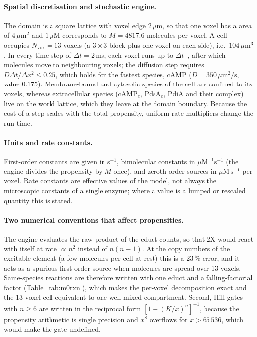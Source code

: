 \paragraph{Spatial discretisation and stochastic engine.}
The domain is a square lattice with voxel edge $2\,\mu$m, so that one voxel has a area of $4\,\mu\mathrm{m}^2$ and $1\,\mu\mathrm{M}$ corresponds to $M=4817.6$ molecules per voxel.
A cell occupies $N_\mathrm{vox}=13$ voxels (a $3\times3$ block plus one voxel on each side), i.e.\ $104\,\mu\mathrm{m}^3$.
In every time step of $\Delta t=2$\,ms, each voxel runs  up to $\Delta t$~\cite{gillespie1977}, after which molecules move to neighbouring voxels; the diffusion step requires $D\Delta t/\Delta x^2\le0.25$, which holds for the fastest species, cAMP ($D=350\,\mu\mathrm{m^2/s}$, value $0.175$).
Membrane-bound and cytosolic species of the cell are confined to its voxels, whereas extracellular species (cAMP$_e$, PdsA$_e$, PdiA and their complex) live on the world lattice, which they leave at the domain boundary.
Because the cost of a step scales with the total propensity, uniform rate multipliers change the run time.

\paragraph{Units and rate constants.}
First-order constants are given in s$^{-1}$, bimolecular constants in $\mu\mathrm{M}^{-1}\mathrm{s}^{-1}$ (the engine divides the propensity by $M$ once), and zeroth-order sources in $\mu\mathrm{M\,s^{-1}}$ per voxel.
Rate constants are effective values of the model, not always the microscopic constants of a single enzyme; where a value is a lumped or rescaled quantity this is stated.

\paragraph{Two numerical conventions that affect propensities.}
The engine evaluates the raw product of the educt counts, so that $2\mathrm X$ would react with itself at rate $\propto n^2$ instead of $n(n-1)$.
At the copy numbers of the excitable element (a few molecules per cell at rest) this is a 23\,\% error, and it acts as a spurious first-order source when molecules are spread over 13 voxels.
Same-species reactions are therefore written with one educt and a falling-factorial factor (Table~\ref{tab:m0rxn}), which makes the per-voxel decomposition exact and the 13-voxel cell equivalent to one well-mixed compartment.
Second, Hill gates with $n\ge6$ are written in the reciprocal form $[1+(K/x)^n]^{-1}$, because the propensity arithmetic is single precision and $x^8$ overflows for $x>65\,536$, which would make the gate undefined.

